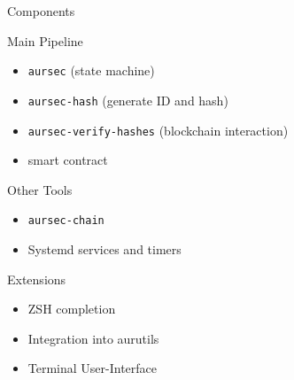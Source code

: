 \documentclass{beamer}
\begin{document}
\begin{frame}{Components}

	\begin{block}{Main Pipeline}
		\begin{itemize}
		\item \texttt{aursec} (state machine)
		\item \texttt{aursec-hash} (generate ID and hash)
		\item \texttt{aursec-verify-hashes} (blockchain interaction)
		\item smart contract
		\end{itemize}
	\end{block}
	\pause
	\begin{block}{Other Tools}
	\begin{itemize}
		\item \texttt{aursec-chain}
		\item Systemd services and timers
	\end{itemize}
	\end{block}
\end{frame}

\begin{frame}{Extensions}
	\begin{itemize}
		\item ZSH completion
		\item Integration into aurutils
		\item Terminal User-Interface
	\end{itemize}
\end{frame}
\end{document}
